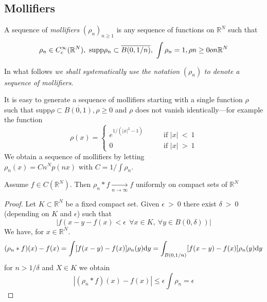 \documentclass[a4paper]{book}
\begin{document}
    \subsection{Mollifiers}
    \begin{defi} A sequence of \emph{mollifiers} $(\rho_n)_{n \ge 1}$ is any sequence of functions on $\mathbb R^N$ such that \[ \rho_n \in C_ c ^ \infty ( \mathbb R^N ), \ {\rm supp}\rho_n \subset \overline{B(0,1/n)}, \ \int \rho_n = 1,\rho n \ge 0 on \mathbb R^N\]
    \end{defi}
    In what follows \emph{we shall systematically use the notation} $(\rho_n)$ \emph{to denote a sequence of mollifiers}.

    It is easy to generate a sequence of mollifiers starting with a single function $\rho$ such that supp$\rho \subset \overline{B(0,1)}, \rho \ge 0$ and $\rho$ does not vanish identically---for example the function
             \[ \rho(x) =
                \begin{cases}
                    e^{1/(|x|^2-1)} & \qquad \text{if } |x| \ < \ 1 \\
                    0               & \qquad \text{if } |x| \ > \ 1
                \end{cases}
             \]
    We obtain a sequence of mollifiers by letting $\rho_n(x) = Cn^Np(nx) \text{ with } C = 1/\int \rho_n$.

    \begin{prop}
         Assume $f \in C(\mathbb R^N)$. Then $\rho_n*f \xrightarrow[n\rightarrow \infty]\ f$ uniformly on compact sets of $\mathbb R^N$
         \begin{proof}
            Let $K \subset \mathbb R^N$ be a fixed compact set. Given $\epsilon \ > \ 0$ there exist $\delta \ > \ 0$ (depending on $K$ and $\epsilon$) such that \[ |f(x-y -f(x) < \epsilon \ \ \forall x \in K, \ \forall y \in B(0, \delta))| \]
            We have, for $x \in \mathbb R^N$.
            \begin{dmath*}
                (\rho_n*f)(x) - f(x) = \int [f( x - y ) - f ( x ) ] \rho_n(y) {\rm d}y  = \int_{B(0,1/n)}[f(x-y)-f(x)] \rho_n(y) {\rm d}y
            \end{dmath*}
            for $n > 1/\delta$ and $X\in K$ we obtain \[ |(\rho_n*f)(x) - f(x)| \le \epsilon \int \rho_n = \epsilon \]
         \end{proof}
    \end{prop}
\end{document}
